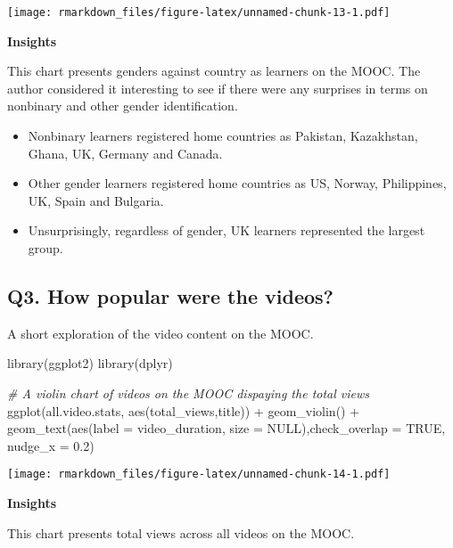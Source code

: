 \documentclass[
]{article}
\newenvironment{Shaded}{\begin{snugshade}}{\end{snugshade}}
\newcommand{\AttributeTok}[1]{\textcolor[rgb]{0.77,0.63,0.00}{#1}}
\newcommand{\CommentTok}[1]{\textcolor[rgb]{0.56,0.35,0.01}{\textit{#1}}}
\newcommand{\ConstantTok}[1]{\textcolor[rgb]{0.00,0.00,0.00}{#1}}
\newcommand{\FloatTok}[1]{\textcolor[rgb]{0.00,0.00,0.81}{#1}}
\newcommand{\FunctionTok}[1]{\textcolor[rgb]{0.00,0.00,0.00}{#1}}
\newcommand{\NormalTok}[1]{#1}
\newcommand{\SpecialCharTok}[1]{\textcolor[rgb]{0.00,0.00,0.00}{#1}}
\begin{document}
\texttt{[image: rmarkdown\_files/figure-latex/unnamed-chunk-13-1.pdf]}

\textbf{Insights}

This chart presents genders against country as learners on the MOOC. The
author considered it interesting to see if there were any surprises in
terms on nonbinary and other gender identification.

\begin{itemize}
\item
  Nonbinary learners registered home countries as Pakistan, Kazakhstan,
  Ghana, UK, Germany and Canada.
\item
  Other gender learners registered home countries as US, Norway,
  Philippines, UK, Spain and Bulgaria.
\item
  Unsurprisingly, regardless of gender, UK learners represented the
  largest group.
\end{itemize}

\newpage

\hypertarget{q3.-how-popular-were-the-videos}{%
\subsection{Q3. How popular were the
videos?}\label{q3.-how-popular-were-the-videos}}

A short exploration of the video content on the MOOC.

\begin{Shaded}
\begin{Highlighting}[]
\FunctionTok{library}\NormalTok{(ggplot2)}
\FunctionTok{library}\NormalTok{(dplyr)}

\CommentTok{\# A violin chart of videos on the MOOC dispaying the total views}
\FunctionTok{ggplot}\NormalTok{(all.video.stats, }\FunctionTok{aes}\NormalTok{(total\_views,title)) }\SpecialCharTok{+} \FunctionTok{geom\_violin}\NormalTok{()  }\SpecialCharTok{+} \FunctionTok{geom\_text}\NormalTok{(}\FunctionTok{aes}\NormalTok{(}\AttributeTok{label =}\NormalTok{ video\_duration, }\AttributeTok{size =} \ConstantTok{NULL}\NormalTok{),}\AttributeTok{check\_overlap =} \ConstantTok{TRUE}\NormalTok{, }\AttributeTok{nudge\_x =} \FloatTok{0.2}\NormalTok{)}
\end{Highlighting}
\end{Shaded}

\texttt{[image: rmarkdown\_files/figure-latex/unnamed-chunk-14-1.pdf]}

\textbf{Insights}

This chart presents total views across all videos on the MOOC.
\end{document}
